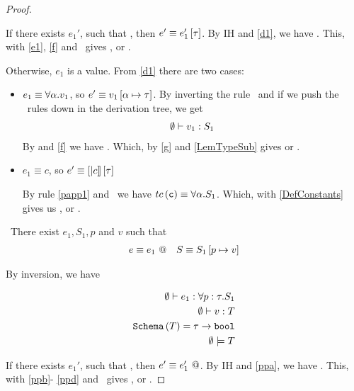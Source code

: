 \begin{proof}
\begin{itemize}
If there exists $e_1'$, such that , 
then $e' \equiv {e_1'} \left[ {\tau}\right]$.
By IH and \ref{d1}, we have .
This, with \ref{e1}, \ref{f} and \tinst\ 
gives , or
.

Otherwise, $e_1$ is a value. From \ref{d1} there are two cases:

\begin{itemize}
\item $e_1 \equiv \forall \alpha . v_{1}$, so $e' \equiv v_1\left[ \alpha \mapsto \tau \right]$.
By inverting the rule \tgen\ and if we push the \tsub\ rules down in the derivation tree,
we get 
\begin{align}
{\emptyset}\vdash {v_1}:{S_1} \label{g}
\end{align}
By \wstExt and \ref{f} we have .
Which, by \ref{g} and \ref{LemTypeSub} gives 
 or
.
 
\item $e_1 \equiv c$, 
so $e' \equiv {[|c|]} \left[ {\tau}\right]$
			
			By rule \ref{papp1} and \tcon \ we have 
			$tc\left(\texttt{c}\right) \equiv \forall \alpha . S_1$.
			Which, with \ref{DefConstants} gives us 
			, or 
			. 
\end{itemize}

\end{itemize}



\item \tpinst\ There exist $e_1, S_1, p$ and $v$ such that
\begin{align*}
e \equiv {e_1} \ @ && S \equiv S_1\left[ p \mapsto v \right]
\end{align*}

By inversion, we have

\begin{align}
{\emptyset}\vdash {e_1}:{\forall p : \tau . S_1} \label{ppa}\\
{\emptyset}\vdash {v}:{T} \label{ppb}\\
\texttt{Schema}\left(T\right) = \tau \rightarrow \texttt{bool} \label{ppc}\\
{\emptyset}\models {T} \label{ppd}
\end{align} 

If there exists $e_1'$, such that , 
then $e' \equiv {e_1'} \ @$.
By IH and \ref{ppa}, we have .
This, with \ref{ppb}- \ref{ppd} and \tpinst\ 
gives , or
\hastypeEmp{e'}{S}.


\end{proof}

